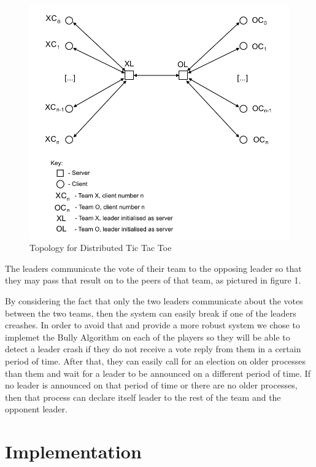 \documentclass[conference]{IEEEtran}
\begin{document}
\begin{figure}[h]
	\includegraphics[width=\linewidth]{images/DAS-topology.png}
	\caption{Topology for Distributed Tic Tac Toe}
	\label{fig:topology1}
\end{figure}

The leaders communicate the vote of their team to the opposing leader so that they may pass that result on to the peers of that team, as pictured in figure 1.

By considering the fact that only the two leaders communicate about the votes between the two teams, then the system can easily break if one of the leaders creashes. 
In order to avoid that and provide a more robust system we chose to implemet the Bully Algorithm on each of the players so they will be able to detect a leader crash if they do not receive a vote reply from them in a certain period of time.
After that, they can easily call for an election on older processes than them and wait for a leader to be announced on a different period of time.
If no leader is announced on that period of time or there are no older processes, then that process can declare itself leader to the rest of the team and the opponent leader.

\section{Implementation}
\end{document}
